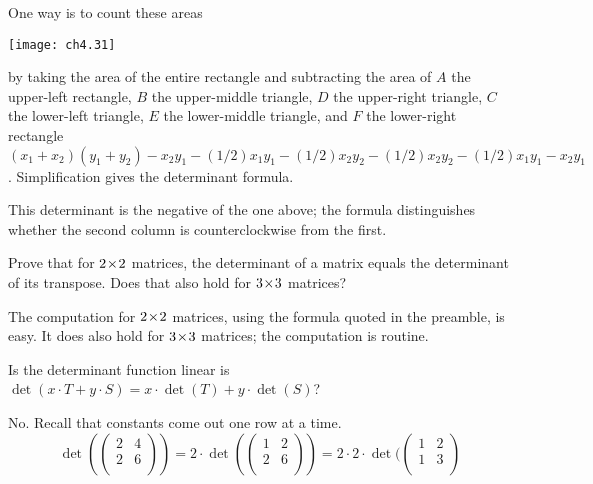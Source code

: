 \begin{exercises}
    \begin{answer}
      One way is to count these areas
      \begin{center}
        \texttt{[image: ch4.31]}
      \end{center}
      by taking the area of the entire rectangle and subtracting the area of
      $A$ the upper-left rectangle, $B$ the upper-middle triangle,
      $D$ the upper-right triangle, $C$ the lower-left triangle, 
      $E$ the lower-middle triangle, and $F$ the lower-right rectangle       
      \( (x_1+x_2)(y_1+y_2)-x_2y_1-(1/2)x_1y_1-(1/2)x_2y_2
              -(1/2)x_2y_2-(1/2)x_1y_1-x_2y_1 \).
      Simplification gives the determinant formula.

      This determinant is the negative of the one above; the formula
      distinguishes whether the second column is counterclockwise from
      the first.  
     \end{answer}
  \item 
    Prove that for \( 2 \! \times \! 2 \) matrices, the determinant of a matrix
    equals the determinant of its transpose.
    Does that also hold for \( 3 \! \times \! 3 \) matrices?
    \begin{answer}
      The computation for \( 2 \! \times \! 2 \) matrices, using the
      formula quoted in the preamble, is easy.
      It does also hold for \( 3 \! \times \! 3 \) matrices; the 
      computation is routine.  
    \end{answer}
  \recommended \item 
    Is the determinant function linear \Dash  is
    \( \det(x\cdot T+y\cdot S)=x\cdot \det(T)+y\cdot \det(S) \)?
    \begin{answer}
      No.
      Recall that constants come out one row at a time.
      \begin{equation*}
         \det(
         \begin{pmatrix}
            2  &4  \\
            2  &6  \\
         \end{pmatrix})
         =
         2\cdot\det(\begin{pmatrix}
            1  &2  \\
            2  &6  \\
         \end{pmatrix})
         =
         2\cdot 2\cdot \det(\begin{pmatrix}
            1  &2  \\
            1  &3  \\

\end{pmatrix}
\end{equation*}
\end{answer}
\end{exercises}
